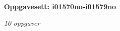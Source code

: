 \centerline{\bf Oppgavesett: i01570no-i01579no}
\vskip 10pt
\centerline{\it 10 oppgaver}\vskip 10pt
\vskip 10pt
